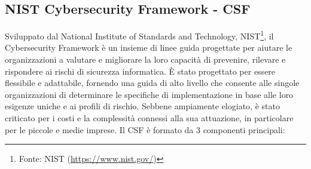 \newpage

    \subsection{NIST Cybersecurity Framework - CSF}
        Sviluppato dal National Institute of Standards and Technology, NIST\footnote{Fonte: NIST (\url{https://www.nist.gov/}) }, il Cybersecurity Framework è un insieme di linee guida  progettate per aiutare le organizzazioni a valutare e migliorare la loro capacità di prevenire, rilevare e rispondere ai rischi di sicurezza informatica. È stato progettato per essere flessibile e adattabile, fornendo una guida di alto livello che consente alle singole organizzazioni di determinare le specifiche di implementazione in base alle loro esigenze uniche e ai profili di rischio. Sebbene ampiamente elogiato, è stato criticato per i costi e la complessità connessi alla sua attuazione, in particolare per le piccole e medie imprese. 
        Il CSF è formato da 3 componenti principali:
